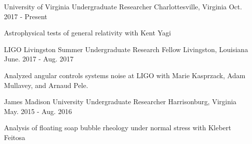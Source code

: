 

\begin{cventries}

  \cventry
    {University of Virginia} %
    {Undergraduate Researcher} %
    {Charlottesville, Virginia} %
    {Oct. 2017 - Present} %
    {
      \begin{cvitems} %
        \item {Astrophysical tests of general relativity with Kent Yagi}
      \end{cvitems}
    }

  \cventry
    {LIGO Livingston} %
    {Summer Undergraduate Research Fellow} %
    {Livingston, Louisiana} %
    {June. 2017 - Aug. 2017 } %
    {
      \begin{cvitems} %
        \item {Analyzed angular controls systems noise at LIGO with Marie Kasprzack, Adam Mullavey, and Arnaud Pele.}
      \end{cvitems}
    }

  \cventry
    {James Madison University} %
    {Undergraduate Researcher} %
    {Harrisonburg, Virginia} %
    {May. 2015 - Aug. 2016 } %
    {
      \begin{cvitems} %
        \item {Analysis of floating soap bubble rheology under normal stress with Klebert Feitosa}
      \end{cvitems}
    }

\end{cventries}
